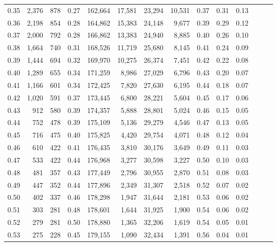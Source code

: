 \begin{tabular}{rrrrrrrrrrrrrr}
0.35 &  2,376 &    878 &  0.27 &  162,664 &   17,581 &  23,294 &  10,531 &  0.37 &  0.31 &      0.13 \\
0.36 &  2,198 &    854 &  0.28 &  164,862 &   15,383 &  24,148 &   9,677 &  0.39 &  0.29 &      0.12 \\
0.37 &  2,000 &    792 &  0.28 &  166,862 &   13,383 &  24,940 &   8,885 &  0.40 &  0.26 &      0.10 \\
0.38 &  1,664 &    740 &  0.31 &  168,526 &   11,719 &  25,680 &   8,145 &  0.41 &  0.24 &      0.09 \\
0.39 &  1,444 &    694 &  0.32 &  169,970 &   10,275 &  26,374 &   7,451 &  0.42 &  0.22 &      0.08 \\
0.40 &  1,289 &    655 &  0.34 &  171,259 &    8,986 &  27,029 &   6,796 &  0.43 &  0.20 &      0.07 \\
0.41 &  1,166 &    601 &  0.34 &  172,425 &    7,820 &  27,630 &   6,195 &  0.44 &  0.18 &      0.07 \\
0.42 &  1,020 &    591 &  0.37 &  173,445 &    6,800 &  28,221 &   5,604 &  0.45 &  0.17 &      0.06 \\
0.43 &    912 &    580 &  0.39 &  174,357 &    5,888 &  28,801 &   5,024 &  0.46 &  0.15 &      0.05 \\
0.44 &    752 &    478 &  0.39 &  175,109 &    5,136 &  29,279 &   4,546 &  0.47 &  0.13 &      0.05 \\
0.45 &    716 &    475 &  0.40 &  175,825 &    4,420 &  29,754 &   4,071 &  0.48 &  0.12 &      0.04 \\
0.46 &    610 &    422 &  0.41 &  176,435 &    3,810 &  30,176 &   3,649 &  0.49 &  0.11 &      0.03 \\
0.47 &    533 &    422 &  0.44 &  176,968 &    3,277 &  30,598 &   3,227 &  0.50 &  0.10 &      0.03 \\
0.48 &    481 &    357 &  0.43 &  177,449 &    2,796 &  30,955 &   2,870 &  0.51 &  0.08 &      0.03 \\
0.49 &    447 &    352 &  0.44 &  177,896 &    2,349 &  31,307 &   2,518 &  0.52 &  0.07 &      0.02 \\
0.50 &    402 &    337 &  0.46 &  178,298 &    1,947 &  31,644 &   2,181 &  0.53 &  0.06 &      0.02 \\
0.51 &    303 &    281 &  0.48 &  178,601 &    1,644 &  31,925 &   1,900 &  0.54 &  0.06 &      0.02 \\
0.52 &    279 &    281 &  0.50 &  178,880 &    1,365 &  32,206 &   1,619 &  0.54 &  0.05 &      0.01 \\
0.53 &    275 &    228 &  0.45 &  179,155 &    1,090 &  32,434 &   1,391 &  0.56 &  0.04 &      0.01 \\

\end{tabular}
